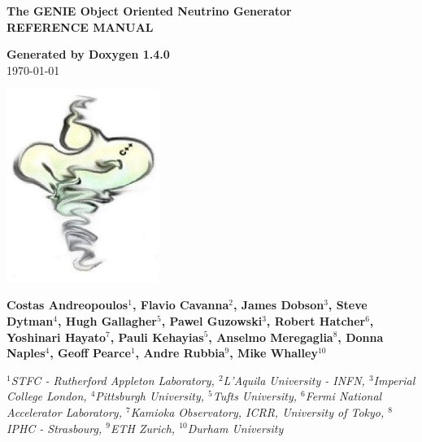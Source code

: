 \documentclass[a4paper]{book}
\begin{document}
\begin{titlepage}
\vspace*{3cm}
\begin{center}

{\Large \textbf{The GENIE Object Oriented Neutrino Generator}}\\
\vspace*{1cm}
{\Large \textbf{REFERENCE MANUAL}}\\
\vspace*{1cm}

{\large \textbf{Generated by Doxygen 1.4.0}}\\
\vspace*{0.5cm}
{\large \today}\\
\vspace*{1cm}

\includegraphics[width=5cm,keepaspectratio]{../../data/logo/genie_logo.eps}

\vspace*{0.6cm}

{\textbf{Costas Andreopoulos$^{1}$, Flavio Cavanna$^{2}$, James Dobson$^{3}$, Steve Dytman$^{4}$,
Hugh Gallagher$^{5}$, Pawel Guzowski$^{3}$, Robert Hatcher$^{6}$, Yoshinari Hayato$^{7}$, Pauli Kehayias$^{5}$, 
Anselmo Meregaglia$^{8}$, Donna Naples$^{4}$, Geoff Pearce$^{1}$, 
Andre Rubbia$^{9}$, Mike Whalley$^{10}$}}\\
\vspace*{0.5cm}

{\textit{
$^{1}$STFC - Rutherford Appleton Laboratory,
$^{2}$L'Aquila University - INFN, 
$^{3}$Imperial College London, 
$^{4}$Pittsburgh University, 
$^{5}$Tufts University,
$^{6}$Fermi National Accelerator Laboratory, 
$^{7}$Kamioka Observatory, ICRR, University of Tokyo, 
$^{8}$IPHC - Strasbourg, 
$^{9}$ETH Zurich, 
$^{10}$Durham University}}

\end{center}
\end{titlepage}
\clearemptydoublepage
{}
\tableofcontents
\clearemptydoublepage
{}
\end{document}

